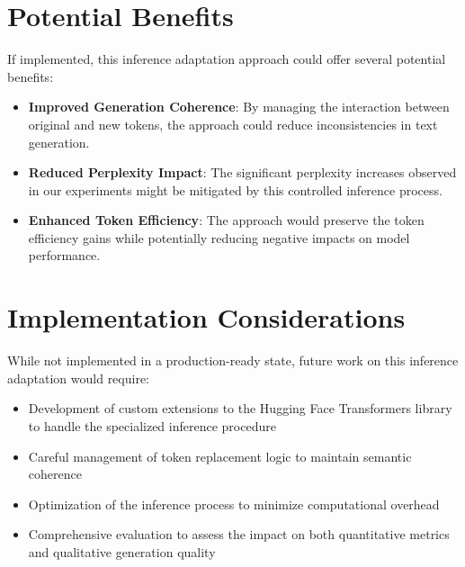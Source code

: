 \section{Potential Benefits}
If implemented, this inference adaptation approach could offer several potential benefits:

\begin{itemize}
    \item \textbf{Improved Generation Coherence}: By managing the interaction between original and new tokens, the approach could reduce inconsistencies in text generation. 
    
    \item \textbf{Reduced Perplexity Impact}: The significant perplexity increases observed in our experiments might be mitigated by this controlled inference process. 
    
    \item \textbf{Enhanced Token Efficiency}: The approach would preserve the token efficiency gains while potentially reducing negative impacts on model performance. 
\end{itemize}

\section{Implementation Considerations}
While not implemented in a production-ready state, future work on this inference adaptation would require:

\begin{itemize}
    \item Development of custom extensions to the Hugging Face Transformers library to handle the specialized inference procedure
    
    \item Careful management of token replacement logic to maintain semantic coherence
    
    \item Optimization of the inference process to minimize computational overhead
    
    \item Comprehensive evaluation to assess the impact on both quantitative metrics and qualitative generation quality
\end{itemize}

